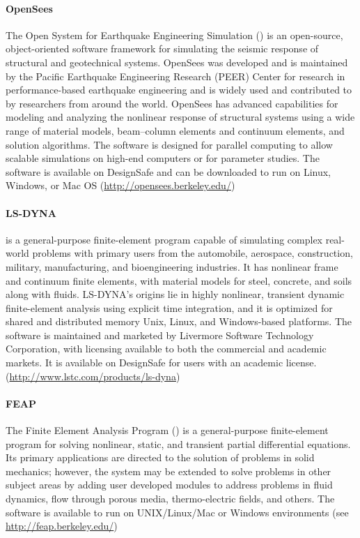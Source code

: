\paragraph{OpenSees} The Open System for Earthquake Engineering Simulation () is an open-source, object-oriented software framework for simulating the seismic response of structural and geotechnical systems. OpenSees was developed and is maintained by the Pacific Earthquake Engineering Research (PEER) Center for research in performance-based earthquake engineering and is widely used and contributed to by researchers from around the world. OpenSees has advanced capabilities for modeling and analyzing the nonlinear response of structural systems using a wide range of material models, beam--column elements and continuum elements, and solution algorithms. The software is designed for parallel computing to allow scalable simulations on high-end computers or for parameter studies. The software is available on DesignSafe and can be downloaded to run on Linux, Windows, or Mac OS (\url{http://opensees.berkeley.edu/})

\paragraph{LS-DYNA}  is a general-purpose finite-element program capable of simulating complex real-world problems with primary users from the automobile, aerospace, construction, military, manufacturing, and bioengineering industries. It has nonlinear frame and continuum finite elements, with material models for steel, concrete, and soils along with fluids. LS-DYNA's origins lie in highly nonlinear, transient dynamic finite-element analysis using explicit time integration, and it is optimized for shared and distributed memory Unix, Linux, and Windows-based platforms. The software is maintained and marketed by Livermore Software Technology Corporation, with licensing available to both the commercial and academic markets. It is available on DesignSafe for users with an academic license. (\url{http://www.lstc.com/products/ls-dyna}) 

\paragraph{FEAP} The Finite Element Analysis Program () is a general-purpose finite-element program for solving nonlinear, static, and transient partial differential equations. Its primary applications are directed to the solution of problems in solid mechanics; however, the system may be extended to solve problems in other subject areas by adding user developed modules to address problems in fluid dynamics, flow through porous media, thermo-electric fields, and others. The software is available to run on UNIX/Linux/Mac or Windows environments (see \url{http://feap.berkeley.edu/})

